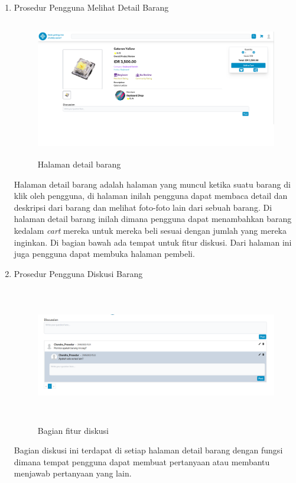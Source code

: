 \documentclass[a4paper]{article}
\begin{document}
\begin{enumerate}
\item Prosedur Pengguna Melihat Detail Barang

\begin{figure}[h]
    \centering
    \includegraphics*[height=6cm]{images/prosedur pengunaan aplikasi/Item Detail.png}
    \caption{Halaman detail barang}
\end{figure}

Halaman detail barang adalah halaman yang muncul ketika suatu barang di klik oleh pengguna, di halaman inilah pengguna dapat membaca detail dan deskripsi dari barang dan melihat foto-foto lain dari sebuah barang. Di halaman detail barang inilah dimana pengguna dapat menambahkan barang kedalam \textit{cart} mereka untuk mereka beli sesuai dengan jumlah yang mereka inginkan. Di bagian bawah ada tempat untuk fitur diskusi. Dari halaman ini juga pengguna dapat membuka halaman pembeli.

\newpage
\item Prosedur Pengguna Diskusi Barang

\begin{figure}[h]
    \centering
    \includegraphics*[width=14cm,height=6cm]{images/prosedur pengunaan aplikasi/Diskusi.png}
    \caption{Bagian fitur diskusi}
\end{figure}

Bagian diskusi ini terdapat di setiap halaman detail barang dengan fungsi dimana tempat pengguna dapat membuat pertanyaan atau membantu menjawab pertanyaan yang lain.


\end{enumerate}
\end{document}
